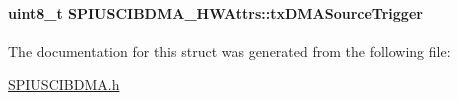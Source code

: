 \paragraph[{tx\-D\-M\-A\-Source\-Trigger}]{\setlength{\rightskip}{0pt plus 5cm}uint8\-\_\-t S\-P\-I\-U\-S\-C\-I\-B\-D\-M\-A\-\_\-\-H\-W\-Attrs\-::tx\-D\-M\-A\-Source\-Trigger}\label{struct_s_p_i_u_s_c_i_b_d_m_a___h_w_attrs_a8cf8e43314d66883d1d680bd2b1d2499}


The documentation for this struct was generated from the following file\-:\begin{DoxyCompactItemize}
\item 
\hyperlink{_s_p_i_u_s_c_i_b_d_m_a_8h}{S\-P\-I\-U\-S\-C\-I\-B\-D\-M\-A.\-h}\end{DoxyCompactItemize}
